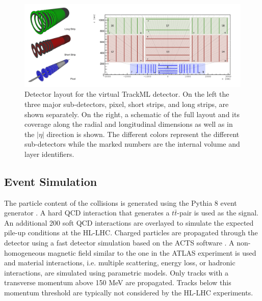 




\begin{figure}[!htbp]
  \centering
  \includegraphics[width=\textwidth]{images/3-track-reconstruction/trackml-detector.png}
  \caption{
    Detector layout for the virtual TrackML detector. On the left the three major sub-detectors, pixel, short strips, and long strips, are shown separately. On the right, a schematic of the full layout and its coverage along the radial and longitudinal dimensions as well as in the $ \lvert \eta \rvert$ direction is shown. The different colors represent the different sub-detectors while the marked numbers are the internal volume and layer identifiers.
  }
  \label{fig:trackml-detector-image}
\end{figure}

\subsection{Event Simulation}
\label{trackml-simulation}
The particle content of the collisions is generated using the Pythia 8 event generator \cite{pythia-8}. A hard QCD interaction that generates a $t\bar{t}$-pair is used as the signal. An additional 200 soft QCD interactions are overlayed to simulate the expected pile-up conditions at the HL-LHC. Charged particles are propagated through the detector using a fast detector simulation based on the ACTS software \cite{Gumpert_2017}. A non-homogeneous magnetic field similar to the one in the ATLAS experiment is used and material interactions, i.e. multiple scattering, energy loss, or hadronic interactions, are simulated using parametric models. Only tracks with a transverse momentum above 150 MeV are propagated. Tracks below this momentum threshold are typically not considered by the HL-LHC experiments.

